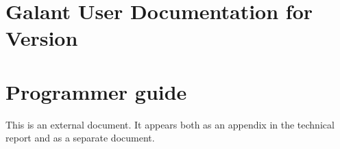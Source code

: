 \documentclass{article}
\begin{document}
\section{Galant User Documentation for Version \VERSION}



\section{Programmer guide} \label{sec:programmer_guide}

This is an external document.
It appears both as an appendix in the technical report and as
a separate document.



\end{document}
